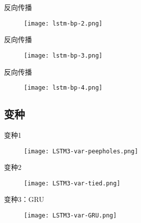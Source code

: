 \begin{frame}[fragile]{反向传播}
  \begin{figure}
    \centering
    \texttt{[image: lstm-bp-2.png]}
  \end{figure}
\end{frame}


\begin{frame}[fragile]{反向传播}
  \begin{figure}
    \centering
    \texttt{[image: lstm-bp-3.png]}
  \end{figure}
\end{frame}


\begin{frame}[fragile]{反向传播}
  \begin{figure}
    \centering
    \texttt{[image: lstm-bp-4.png]}
  \end{figure}
\end{frame}


\subsection{变种}

\begin{frame}[fragile]{变种1}
  \begin{figure}
    \centering
    \texttt{[image: LSTM3-var-peepholes.png]}
  \end{figure}
\end{frame}

\begin{frame}[fragile]{变种2}
  \begin{figure}
    \centering
    \texttt{[image: LSTM3-var-tied.png]}
  \end{figure}
\end{frame}

\begin{frame}[fragile]{变种3：GRU}
  \begin{figure}
    \centering
    \texttt{[image: LSTM3-var-GRU.png]}
  \end{figure}
\end{frame}
